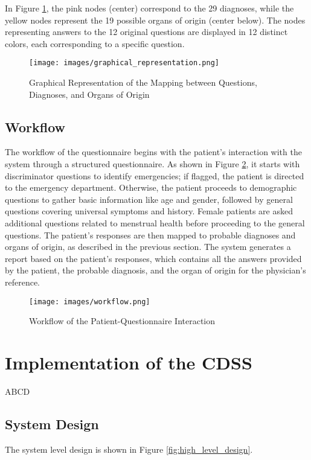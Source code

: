 \noindent In Figure \ref{fig:graphical_representation}, the pink nodes (center) correspond to the 29 diagnoses, while the yellow nodes represent the 19 possible organs of origin (center below). The nodes representing answers to the 12 original questions are displayed in 12 distinct colors, each corresponding to a specific question.

\begin{figure}[H]
    \centering
    \texttt{[image: images/graphical\_representation.png]}
    \caption{Graphical Representation of the Mapping between Questions, Diagnoses, and Organs of Origin}
    \label{fig:graphical_representation}
\end{figure}

\subsection{Workflow}
The workflow of the questionnaire begins with the patient's interaction with the system through a structured questionnaire. As shown in Figure \ref{fig:workflow}, it starts with discriminator questions to identify emergencies; if flagged, the patient is directed to the emergency department. Otherwise, the patient proceeds to demographic questions to gather basic information like age and gender, followed by general questions covering universal symptoms and history. Female patients are asked additional questions related to menstrual health before proceeding to the general questions. The patient's responses are then mapped to probable diagnoses and organs of origin, as described in the previous section. The system generates a report based on the patient's responses, which contains all the answers provided by the patient, the probable diagnosis, and the organ of origin for the physician's reference.
\begin{figure}[h]
    \centering
    \texttt{[image: images/workflow.png]}
    \caption{Workflow of the Patient-Questionnaire Interaction}
    \label{fig:workflow}
\end{figure}

\section{Implementation of the CDSS}

ABCD %
\subsection{System Design}
The system level design is shown in Figure \ref{fig:high_level_design}.

